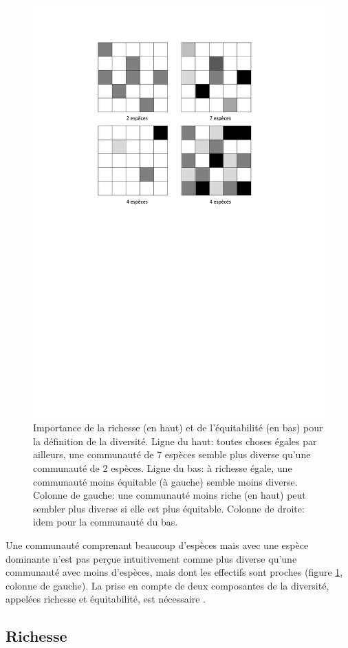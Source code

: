 \documentclass[
  11pt,
  french,
  a4paper,
  extrafontsizes,onecolumn,openright
  ]{memoir}
\begin{document}
\begin{figure}

{\centering \includegraphics[width=0.6\linewidth]{images/Composantes} 

}

\caption{Importance de la richesse (en haut) et de l'équitabilité (en bas) pour la définition de la diversité. Ligne du haut: toutes choses égales par ailleurs, une communauté de 7 espèces semble plus diverse qu'une communauté de 2 espèces. Ligne du bas: à richesse égale, une communauté moins équitable (à gauche) semble moins diverse. Colonne de gauche: une communauté moins riche (en haut) peut sembler plus diverse si elle est plus équitable. Colonne de droite: idem pour la communauté du bas.}\label{fig:Composantes}
\end{figure}

\normalsize

Une communauté comprenant beaucoup d'espèces mais avec une espèce dominante n'est pas perçue intuitivement comme plus diverse qu'une communauté avec moins d'espèces, mais dont les effectifs sont proches (figure \ref{fig:Composantes}, colonne de gauche).
La prise en compte de deux composantes de la diversité, appelées richesse et équitabilité, est nécessaire \autocite{Whittaker1965}.

\hypertarget{richesse}{%
\subsection{Richesse}\label{richesse}}
\end{document}
